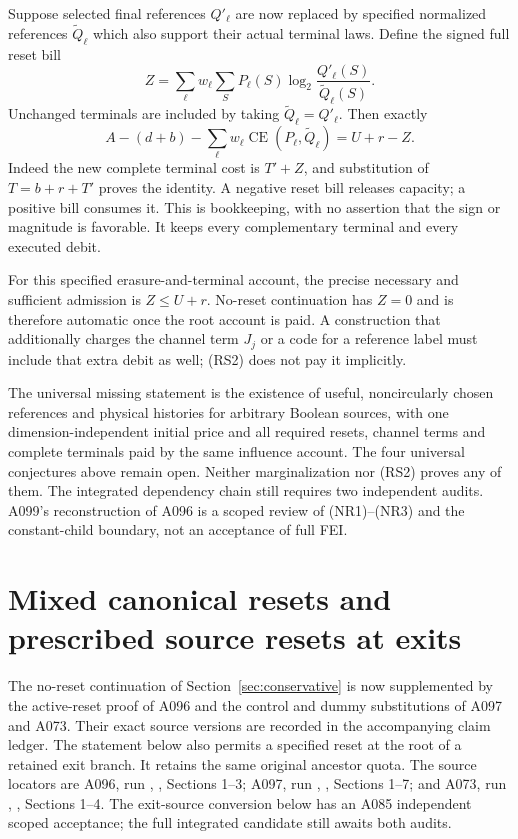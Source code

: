 \documentclass[11pt]{article}
\newcommand{\CE}{\operatorname{CE}}
\begin{document}
Suppose selected final references $Q'_\ell$ are now replaced by
specified normalized references $\widetilde Q_\ell$ which also
support their actual terminal laws. Define the signed full reset
bill
\[
 Z=\sum_\ell w_\ell\sum_S P_\ell(S)
                \log_2\frac{Q'_\ell(S)}{\widetilde Q_\ell(S)}.
 \tag{RS1}
\]
Unchanged terminals are included by taking
$\widetilde Q_\ell=Q'_\ell$. Then exactly
\[
 A-(d+b)-\sum_\ell w_\ell\CE(P_\ell,\widetilde Q_\ell)
       =U+r-Z.
 \tag{RS2}
\]
Indeed the new complete terminal cost is $T'+Z$, and substitution
of $T=b+r+T'$ proves the identity. A negative reset bill releases
capacity; a positive bill consumes it. This is bookkeeping, with
no assertion that the sign or magnitude is favorable. It keeps
every complementary terminal and every executed debit.

For this specified erasure-and-terminal account, the precise
necessary and sufficient admission is $Z\le U+r$. No-reset
continuation has $Z=0$ and is therefore automatic once the root
account is paid. A construction that additionally charges the
channel term $J_j$ or a code for a reference label must include
that extra debit as well; (RS2) does not pay it implicitly.

The universal missing statement is the existence of useful,
noncircularly chosen references and physical histories for arbitrary
Boolean sources, with one dimension-independent initial price and
all required resets, channel terms and complete terminals paid by
the same influence account. The four universal conjectures above
remain open. Neither marginalization nor (RS2) proves any of them.
The integrated dependency chain still requires two independent
audits. A099's reconstruction of A096 is a scoped review of (NR1)--(NR3)
and the constant-child boundary, not an acceptance of full FEI.

\section{Mixed canonical resets and prescribed source resets at exits}
\label{sec:mixedexits}
The no-reset continuation of Section~\ref{sec:conservative} is now
supplemented by the active-reset proof of A096 and the control and
dummy substitutions of A097 and A073. Their exact source versions
are recorded in the accompanying claim ledger. The statement below
also permits a specified reset at the root of a retained exit branch.
It retains the same original ancestor quota.
The source locators are A096, run
,
, Sections 1--3; A097, run
,
, Sections 1--7; and A073, run
,
, Sections 1--4. The exit-source conversion
below has an A085 independent scoped acceptance; the full integrated
candidate still awaits both audits.
\end{document}
